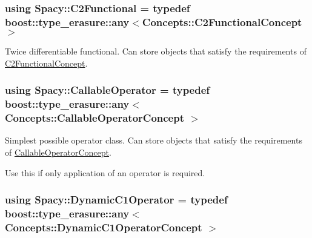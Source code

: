 \subsubsection[{C2\+Functional}]{\setlength{\rightskip}{0pt plus 5cm}using {\bf Spacy\+::\+C2\+Functional} = typedef boost\+::type\+\_\+erasure\+::any$<$Concepts\+::\+C2\+Functional\+Concept$>$}\label{group__SpacyGroup_gaf5b89e117806134b06a1ce4629fb2b65_gaf5b89e117806134b06a1ce4629fb2b65}


Twice differentiable functional. Can store objects that satisfy the requirements of \hyperlink{group__ConceptGroup_gafb4414561b07b27100cad81ecf152e47_C2FunctionalConceptAnchor}{C2\+Functional\+Concept}. 

\label{group__SpacyGroup_gaf5b89e117806134b06a1ce4629fb2b65_C2FunctionalAnchor}%
\hypertarget{group__SpacyGroup_gaf5b89e117806134b06a1ce4629fb2b65_C2FunctionalAnchor}{}%
\hypertarget{group__SpacyGroup_ga2b74020d806ad800795cdd97dab3466f_ga2b74020d806ad800795cdd97dab3466f}{}
\subsubsection[{Callable\+Operator}]{\setlength{\rightskip}{0pt plus 5cm}using {\bf Spacy\+::\+Callable\+Operator} = typedef boost\+::type\+\_\+erasure\+::any$<$ Concepts\+::\+Callable\+Operator\+Concept $>$}\label{group__SpacyGroup_ga2b74020d806ad800795cdd97dab3466f_ga2b74020d806ad800795cdd97dab3466f}


Simplest possible operator class. Can store objects that satisfy the requirements of \hyperlink{group__ConceptGroup_gadec0c664abaacc2065dadd8b11cc8d30_CallableOperatorConceptAnchor}{Callable\+Operator\+Concept}. 

\label{group__SpacyGroup_ga2b74020d806ad800795cdd97dab3466f_CallableOperatorAnchor}%
\hypertarget{group__SpacyGroup_ga2b74020d806ad800795cdd97dab3466f_CallableOperatorAnchor}{}%
Use this if only application of an operator is required. \hypertarget{group__SpacyGroup_gabc9c830d2a7e020bcab097b10ee6f642_gabc9c830d2a7e020bcab097b10ee6f642}{}
\subsubsection[{Dynamic\+C1\+Operator}]{\setlength{\rightskip}{0pt plus 5cm}using {\bf Spacy\+::\+Dynamic\+C1\+Operator} = typedef boost\+::type\+\_\+erasure\+::any$<$ Concepts\+::\+Dynamic\+C1\+Operator\+Concept $>$}\label{group__SpacyGroup_gabc9c830d2a7e020bcab097b10ee6f642_gabc9c830d2a7e020bcab097b10ee6f642}


